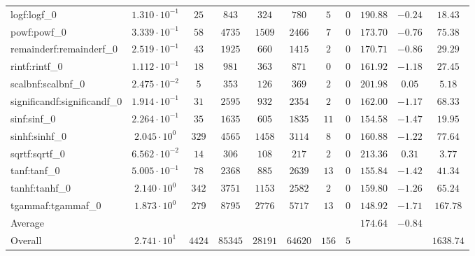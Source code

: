 \begin{tabular}{|l|c|c|c|c|c|c|c|c|c|c|}
logf:logf\_0                 & $ 1.310 \cdot 10^{-1} $ & $ 25     $ & $ 843   $ & $ 324   $ & $ 780   $ & $ 5   $ & $ 0 $ & $ 190.88      $ & $ -0.24   $ & $ 18.43   $ \\
powf:powf\_0                 & $ 3.339 \cdot 10^{-1} $ & $ 58     $ & $ 4735  $ & $ 1509  $ & $ 2466  $ & $ 7   $ & $ 0 $ & $ 173.70      $ & $ -0.76   $ & $ 75.38   $ \\
remainderf:remainderf\_0     & $ 2.519 \cdot 10^{-1} $ & $ 43     $ & $ 1925  $ & $ 660   $ & $ 1415  $ & $ 2   $ & $ 0 $ & $ 170.71      $ & $ -0.86   $ & $ 29.29   $ \\
rintf:rintf\_0               & $ 1.112 \cdot 10^{-1} $ & $ 18     $ & $ 981   $ & $ 363   $ & $ 871   $ & $ 0   $ & $ 0 $ & $ 161.92      $ & $ -1.18   $ & $ 27.45   $ \\
scalbnf:scalbnf\_0           & $ 2.475 \cdot 10^{-2} $ & $ 5      $ & $ 353   $ & $ 126   $ & $ 369   $ & $ 2   $ & $ 0 $ & $ 201.98      $ & $ 0.05    $ & $ 5.18    $ \\
significandf:significandf\_0 & $ 1.914 \cdot 10^{-1} $ & $ 31     $ & $ 2595  $ & $ 932   $ & $ 2354  $ & $ 2   $ & $ 0 $ & $ 162.00      $ & $ -1.17   $ & $ 68.33   $ \\
sinf:sinf\_0                 & $ 2.264 \cdot 10^{-1} $ & $ 35     $ & $ 1635  $ & $ 605   $ & $ 1835  $ & $ 11  $ & $ 0 $ & $ 154.58      $ & $ -1.47   $ & $ 19.95   $ \\
sinhf:sinhf\_0               & $ 2.045 \cdot 10^{0}  $ & $ 329    $ & $ 4565  $ & $ 1458  $ & $ 3114  $ & $ 8   $ & $ 0 $ & $ 160.88      $ & $ -1.22   $ & $ 77.64   $ \\
sqrtf:sqrtf\_0               & $ 6.562 \cdot 10^{-2} $ & $ 14     $ & $ 306   $ & $ 108   $ & $ 217   $ & $ 2   $ & $ 0 $ & $ 213.36      $ & $ 0.31    $ & $ 3.77    $ \\
tanf:tanf\_0                 & $ 5.005 \cdot 10^{-1} $ & $ 78     $ & $ 2368  $ & $ 885   $ & $ 2639  $ & $ 13  $ & $ 0 $ & $ 155.84      $ & $ -1.42   $ & $ 41.34   $ \\
tanhf:tanhf\_0               & $ 2.140 \cdot 10^{0}  $ & $ 342    $ & $ 3751  $ & $ 1153  $ & $ 2582  $ & $ 2   $ & $ 0 $ & $ 159.80      $ & $ -1.26   $ & $ 65.24   $ \\
tgammaf:tgammaf\_0           & $ 1.873 \cdot 10^{0}  $ & $ 279    $ & $ 8795  $ & $ 2776  $ & $ 5717  $ & $ 13  $ & $ 0 $ & $ 148.92      $ & $ -1.71   $ & $ 167.78  $ \\
\hline
Average                      & $                     $ & $        $ & $       $ & $       $ & $       $ & $     $ & $   $ & $ 174.64      $ & $ -0.84   $ & $         $ \\
\hline
Overall                      & $ 2.741 \cdot 10^{1}  $ & $ 4424   $ & $ 85345 $ & $ 28191 $ & $ 64620 $ & $ 156 $ & $ 5 $ & $             $ & $         $ & $ 1638.74 $ \\
\hline
\end{tabular}
